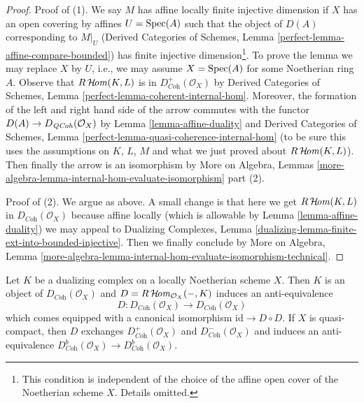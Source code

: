 \begin{proof}
Proof of (1). We say $M$ has affine locally finite injective dimension
if $X$ has an open covering by affines $U = \mathop{\mathrm{Spec}}(A)$ such that the object
of $D(A)$ corresponding to $M|_U$ (Derived Categories of Schemes, Lemma
\ref{perfect-lemma-affine-compare-bounded})
has finite injective dimension\footnote{This condition is independent of the
choice of the affine open cover of the Noetherian scheme $X$.
Details omitted.}. To prove the lemma we may
replace $X$ by $U$, i.e., we may assume $X = \mathop{\mathrm{Spec}}(A)$
for some Noetherian ring $A$. Observe that
$R\mathop{\mathcal{H}\!\mathit{om}}\nolimits(K, L)$ is in $D^+_{\textit{Coh}}(\mathcal{O}_X)$ by
Derived Categories of Schemes, Lemma
\ref{perfect-lemma-coherent-internal-hom}.
Moreover, the formation of the left and right hand side
of the arrow commutes with the functor $D(A) \to D_{\mathit{QCoh}}(\mathcal{O}_X)$ by
Lemma \ref{lemma-affine-duality} and
Derived Categories of Schemes, Lemma
\ref{perfect-lemma-quasi-coherence-internal-hom}
(to be sure this uses the assumptions on $K$, $L$, $M$ and what we just
proved about $R\mathop{\mathcal{H}\!\mathit{om}}\nolimits(K, L)$).
Then finally the arrow is an isomorphism by
More on Algebra, Lemmas
\ref{more-algebra-lemma-internal-hom-evaluate-isomorphism} part (2).

\medskip\noindent
Proof of (2). We argue as above. A small change is that here we get
$R\mathop{\mathcal{H}\!\mathit{om}}\nolimits(K, L)$ in $D_{\textit{Coh}}(\mathcal{O}_X)$ because
affine locally (which is allowable by Lemma \ref{lemma-affine-duality})
we may appeal to Dualizing Complexes, Lemma
\ref{dualizing-lemma-finite-ext-into-bounded-injective}.
Then we finally conclude by
More on Algebra, Lemma
\ref{more-algebra-lemma-internal-hom-evaluate-isomorphism-technical}.
\end{proof}

\begin{lemma}
\label{lemma-dualizing-schemes}
Let $K$ be a dualizing complex on a locally Noetherian scheme $X$.
Then $K$ is an object of $D_{\textit{Coh}}(\mathcal{O}_X)$
and $D = R\mathop{\mathcal{H}\!\mathit{om}}\nolimits_{\mathcal{O}_X}(-, K)$ induces an anti-equivalence
$$
D :
D_{\textit{Coh}}(\mathcal{O}_X)
\longrightarrow
D_{\textit{Coh}}(\mathcal{O}_X)
$$
which comes equipped with a canonical isomorphism
$\text{id} \to D \circ D$. If $X$ is quasi-compact, then
$D$ exchanges $D^+_{\textit{Coh}}(\mathcal{O}_X)$ and
$D^-_{\textit{Coh}}(\mathcal{O}_X)$ and induces an anti-equivalence
$D^b_{\textit{Coh}}(\mathcal{O}_X) \to D^b_{\textit{Coh}}(\mathcal{O}_X)$.
\end{lemma}

